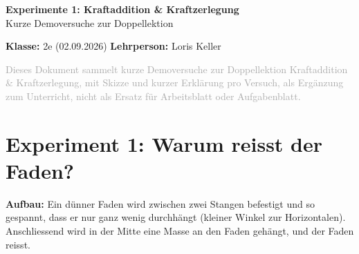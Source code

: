 \documentclass[11pt,a4paper]{article}
\begin{document}
\sloppy

\begin{center}
{\Huge\bfseries\color{titleblue}Experimente 1: Kraftaddition \& Kraftzerlegung}\\[0.4em]
{\large Kurze Demoversuche zur Doppellektion}
\end{center}
\vspace{0.5em}

\noindent\textbf{Klasse:} 2e (02.09.2026) \hfill \textbf{Lehrperson:} Loris Keller

\vspace{0.3em}
\noindent\textcolor{darkgray}{Dieses Dokument sammelt kurze Demoversuche zur
Doppellektion Kraftaddition \& Kraftzerlegung, mit Skizze und kurzer
Erklärung pro Versuch, als Ergänzung zum Unterricht, nicht als Ersatz für
Arbeitsblatt oder Aufgabenblatt.}

\section*{Experiment 1: Warum reisst der Faden?}

\textbf{Aufbau:} Ein dünner Faden wird zwischen zwei Stangen befestigt und
so gespannt, dass er nur ganz wenig durchhängt (kleiner Winkel zur
Horizontalen). Anschliessend wird in der Mitte eine Masse an den Faden
gehängt, und der Faden reisst.

\begin{center}
\hspace{1cm}
\end{center}
\end{document}

